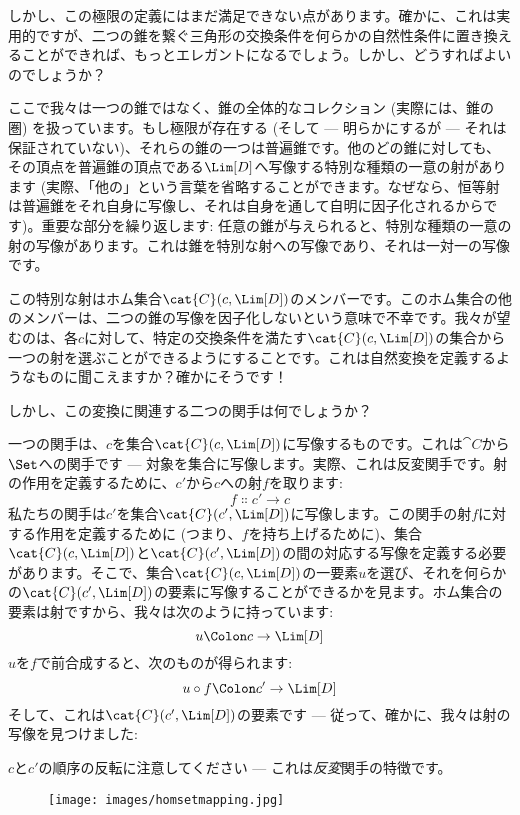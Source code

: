 しかし、この極限の定義にはまだ満足できない点があります。確かに、これは実用的ですが、二つの錐を繋ぐ三角形の交換条件を何らかの自然性条件に置き換えることができれば、もっとエレガントになるでしょう。しかし、どうすればよいのでしょうか？

ここで我々は一つの錐ではなく、錐の全体的なコレクション (実際には、錐の圏) を扱っています。もし極限が存在する (そして --- 明らかにするが --- それは保証されていない)、それらの錐の一つは普遍錐です。他のどの錐に対しても、その頂点を普遍錐の頂点である$\Lim[D]$へ写像する特別な種類の一意の射があります (実際、「他の」という言葉を省略することができます。なぜなら、恒等射は普遍錐をそれ自身に写像し、それは自身を通して自明に因子化されるからです)。重要な部分を繰り返します: 任意の錐が与えられると、特別な種類の一意の射の写像があります。これは錐を特別な射への写像であり、それは一対一の写像です。

この特別な射はホム集合$\cat{C}(c, \Lim[D])$のメンバーです。このホム集合の他のメンバーは、二つの錐の写像を因子化しないという意味で不幸です。我々が望むのは、各$c$に対して、特定の交換条件を満たす$\cat{C}(c, \Lim[D])$の集合から一つの射を選ぶことができるようにすることです。これは自然変換を定義するようなものに聞こえますか？確かにそうです！

しかし、この変換に関連する二つの関手は何でしょうか？

一つの関手は、$c$を集合$\cat{C}(c, \Lim[D])$に写像するものです。これは$\cat{C}$から$\Set$への関手です --- 対象を集合に写像します。実際、これは反変関手です。射の作用を定義するために、$c'$から$c$への射$f$を取ります: 
\[f \Colon c' \to c\]
私たちの関手は$c'$を集合$\cat{C}(c', \Lim[D])$に写像します。この関手の射$f$に対する作用を定義するために (つまり、$f$を持ち上げるために)、集合$\cat{C}(c, \Lim[D])$と$\cat{C}(c', \Lim[D])$の間の対応する写像を定義する必要があります。そこで、集合$\cat{C}(c, \Lim[D])$の一要素$u$を選び、それを何らかの$\cat{C}(c', \Lim[D])$の要素に写像することができるかを見ます。ホム集合の要素は射ですから、我々は次のように持っています: 
\[u \Colon c \to \Lim[D]\]
$u$を$f$で前合成すると、次のものが得られます: 
\[u \circ f \Colon c' \to \Lim[D]\]
そして、これは$\cat{C}(c', \Lim[D])$の要素です --- 従って、確かに、我々は射の写像を見つけました: 

$c$と$c'$の順序の反転に注意してください --- これは\emph{反変}関手の特徴です。

\begin{figure}[H]
  \centering
  \texttt{[image: images/homsetmapping.jpg]}
\end{figure}

